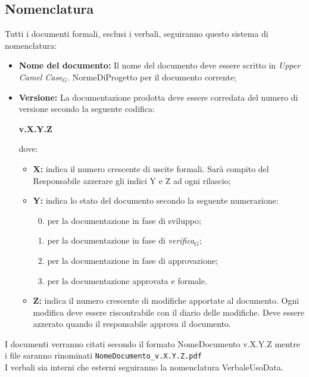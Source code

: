 \subsection{Nomenclatura}
Tutti i documenti formali, esclusi i verbali, seguiranno questo sistema di nomenclatura:
\begin{itemize}
	\item \textbf{Nome del documento:} Il nome del documento deve essere scritto in \textit{Upper Camel Case$_{G}$}.
	NormeDiProgetto per il documento corrente;
	\item \textbf{Versione:} La documentazione prodotta deve essere corredata del numero di versione secondo la seguente codifica:
	
	\textbf{v.X.Y.Z}
	
	dove:
	\begin{itemize}
		\item \textbf{X:} indica il numero crescente di uscite formali. Sarà compito del Responsabile azzerare gli indici Y e Z ad ogni rilascio;
		\item \textbf{Y:} indica lo stato del documento secondo la seguente numerazione:
		\begin{enumerate}
			\setcounter{enumi}{-1}
			\item per la documentazione in fase di sviluppo;
			\item per la documentazione in fase di \textit{verifica$_{G}$};
			\item per la documentazione in fase di approvazione;
			\item per la documentazione approvata e formale.
		\end{enumerate}
		\item \textbf{Z:} indica il numero crescente di modifiche apportate al documento. Ogni modifica deve essere riscontrabile con il diario delle modifiche. Deve essere azzerato quando il responsabile approva il documento. 	
	\end{itemize}
\end{itemize}

I documenti verranno citati secondo il formato NomeDocumento v.X.Y.Z mentre i file saranno rinominati \texttt{NomeDocumento\_v.X.Y.Z.pdf} \\
I verbali sia interni che esterni seguiranno la nomenclatura VerbaleUsoData.

